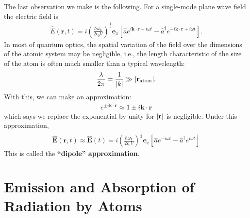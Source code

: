 \documentclass{book}
\theoremstyle{definition}
\newcommand{\f}[2]{\frac{#1}{#2}}
\newcommand{\lp}{\left(}
\newcommand{\rp}{\right)}
\newcommand{\lb}{\left[}
\newcommand{\rb}{\right]}
\begin{document}
The last observation we make is the following. For a single-mode plane wave field the electric field is
\begin{align}
\hat{E}(\mathbf{r},t) = i\lp \f{\hbar\omega_k}{2\epsilon_0 V} \rp^{\f{1}{2}}\mathbf{e}_x\lb \hat{a} e^{i\mathbf{k}\cdot\mathbf{r} - i\omega t} - \hat{a}^\dagger e^{-i\mathbf{k}\cdot\mathbf{r} + i\omega t} \rb.
\end{align}
In most of quantum optics, the spatial variation of the field over the dimensions of the atomic system may be negligible, i.e., the length characteristic of the size of the atom is often much smaller than a typical wavelength:
\begin{align}
\f{\lambda}{2\pi} = \f{1}{\abs{k}} \gg \abs{\mathbf{r}_\text{atom}}.
\end{align}
With this, we can make an approximation:
\begin{align}
e^{\pm i\mathbf{k}\cdot\mathbf{r}} \approx 1 \pm i\mathbf{k}\cdot\mathbf{r}
\end{align}
which says we replace the exponential by unity for $\abs{\mathbf{r}}$ is negligible. Under this approximation, 
\begin{align}\label{dipoleE}
\boxed{\hat{\mathbf{E}}(\mathbf{r},t)  \approx \hat{\mathbf{E}}(t) = i \lp \f{\hbar\omega_k}{2\epsilon_0 V} \rp^{\f{1}{2}}\mathbf{e}_x \lb \hat{a}e^{-i\omega t} - \hat{a}^\dagger e^{i\omega t} \rb}
\end{align}
This is called the \textbf{``dipole'' approximation}. 




%

\newpage

\section{Emission and Absorption of Radiation by Atoms}
\end{document}
